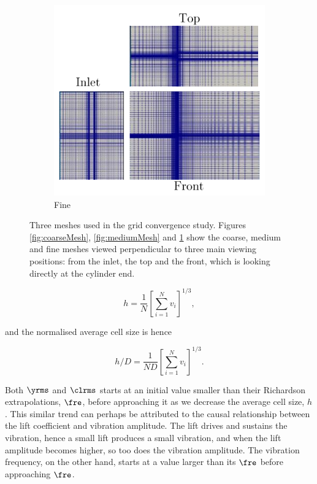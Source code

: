 \documentclass[a4paper,fleqn]{cas-sc}
\begin{document}
\begin{figure}
  \begin{subfigure}[h]{0.3\textwidth}
    \includegraphics[width=\textwidth]{figs/figure6c}
    \caption{Fine}
    \label{fig:fineMesh}
  \end{subfigure}

  \caption{Three meshes used in the grid convergence study. Figures \ref{fig:coarseMesh}, \ref{fig:mediumMesh} and \ref{fig:fineMesh} show the coarse, medium and fine meshes viewed perpendicular to three main viewing positions: from the inlet, the top and the front, which is looking directly at the cylinder end.} \label{fig:convergenceStudy}
\end{figure}

\begin{equation}
  h = \frac{1}{N} \left [ \sum_{i=1}^{N} v_{i} \right ]^{1/3},
  \label{eq:averageCellSize}
\end{equation}

\noindent and the normalised average cell size is hence 


\begin{equation}
  h/D = \frac{1}{ND} \left [ \sum_{i=1}^{N} v_{i} \right ]^{1/3}.
  \label{eq:normAveCellSize}
\end{equation}

Both $\yrms$ and $\clrms$ starts at an initial value smaller than their Richardson extrapolations, $\fre$, before approaching it as we decrease the average cell size, $h$. This similar trend can perhaps be attributed to the causal relationship between the lift coefficient and vibration amplitude. The lift drives and sustains the vibration, hence a small lift produces a small vibration, and when the lift amplitude becomes higher, so too does the vibration amplitude. The vibration frequency, on the other hand, starts at a value larger than its $\fre$ before approaching $\fre$.
\end{document}
